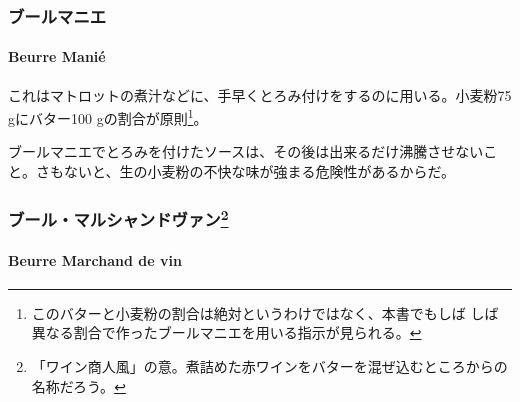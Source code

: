 \begin{recette}
\maeaki

\hypertarget{ux30d6ux30fcux30ebux30deux30cbux30a8}{%
\subsubsection{ブールマニエ}\label{ux30d6ux30fcux30ebux30deux30cbux30a8}}

\hypertarget{beurre-manie}{%
\paragraph{Beurre Manié}\label{beurre-manie}}


これはマトロットの煮汁などに、手早くとろみ付けをするのに用いる。小麦粉75
gにバター100 gの割合が原則\footnote{このバターと小麦粉の割合は絶対というわけではなく、本書でもしば
  しば異なる割合で作ったブールマニエを用いる指示が見られる。}。

ブールマニエでとろみを付けたソースは、その後は出来るだけ沸騰させないこ
と。さもないと、生の小麦粉の不快な味が強まる危険性があるからだ。

\maeaki

\hypertarget{ux30d6ux30fcux30ebux30deux30ebux30b7ux30e3ux30f3ux30c9ux30f4ux30a1ux30f330}{%
\subsubsection[ブール・マルシャンドヴァン]{\texorpdfstring{ブール・マルシャンドヴァン\footnote{「ワイン商人風」の意。煮詰めた赤ワインをバターを混ぜ込むところからの名称だろう。}}{ブール・マルシャンドヴァン}}\label{ux30d6ux30fcux30ebux30deux30ebux30b7ux30e3ux30f3ux30c9ux30f4ux30a1ux30f330}}

\hypertarget{beurre-marchand-de-vin}{%
\paragraph{Beurre Marchand de vin}\label{beurre-marchand-de-vin}}



\end{recette}
